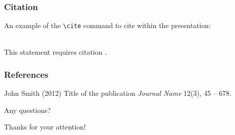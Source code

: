 \documentclass{beamer}
\begin{document}

\begin{frame}[fragile] %
\frametitle{Citation}
An example of the \verb|\cite| command to cite within the presentation:\\~

This statement requires citation \cite{p1}.
\end{frame}


\begin{frame}
\frametitle{References}
\footnotesize{
\begin{thebibliography}{99} %
 John Smith (2012)
\newblock Title of the publication
\newblock \emph{Journal Name} 12(3), 45 -- 678.
\end{thebibliography}
}
\end{frame}


\begin{frame}
\Huge{\centerline{Any questions?}}
\end{frame}


\begin{frame}
\Huge{\centerline{Thanks for your attention!}}
\end{frame}

\end{document}
